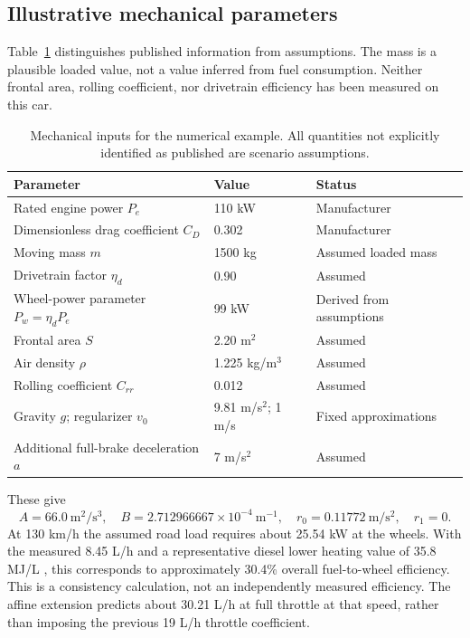 \documentclass[10pt,a4paper]{article}
\begin{document}
\subsection{Illustrative mechanical parameters}
Table~\ref{tab:assumptions} distinguishes published information from assumptions. The mass is a plausible loaded value, not a value inferred from fuel consumption. Neither frontal area, rolling coefficient, nor drivetrain efficiency has been measured on this car.
\begin{table}[htbp]
\centering
\caption{Mechanical inputs for the numerical example. All quantities not explicitly identified as published are scenario assumptions.}
\label{tab:assumptions}
\begin{tabular}{@{}lll@{}}
\toprule
Parameter & Value & Status\\
\midrule
Rated engine power $P_e$ & 110 kW & Manufacturer \cite{skoda}\\
Dimensionless drag coefficient $C_D$ & 0.302 & Manufacturer \cite{skoda}\\
Moving mass $m$ & 1500 kg & Assumed loaded mass\\
Drivetrain factor $\eta_d$ & 0.90 & Assumed\\
Wheel-power parameter $P_w=\eta_dP_e$ & 99 kW & Derived from assumptions\\
Frontal area $S$ & 2.20 m$^2$ & Assumed\\
Air density $\rho$ & 1.225 kg/m$^3$ & Assumed\\
Rolling coefficient $C_{rr}$ & 0.012 & Assumed\\
Gravity $g$; regularizer $v_0$ & 9.81 m/s$^2$; 1 m/s & Fixed approximations\\
Additional full-brake deceleration $a$ & 7 m/s$^2$ & Assumed\\
\bottomrule
\end{tabular}
\end{table}
These give
\begin{equation}
A=66.0\ \mathrm{m^2/s^3},\quad
B=2.712966667\times10^{-4}\ \mathrm{m^{-1}},\quad
r_0=0.11772\ \mathrm{m/s^2},\quad r_1=0.
\label{eq:mechnumbers}
\end{equation}
At 130 km/h the assumed road load requires about 25.54 kW at the wheels. With the measured 8.45 L/h and a representative diesel lower heating value of 35.8 MJ/L \cite{diesel}, this corresponds to approximately 30.4\% overall fuel-to-wheel efficiency. This is a consistency calculation, not an independently measured efficiency. The affine extension predicts about 30.21 L/h at full throttle at that speed, rather than imposing the previous 19 L/h throttle coefficient.
\end{document}
